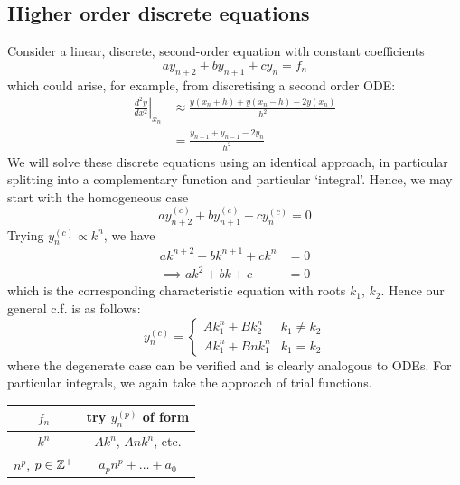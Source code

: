 \documentclass{../../template/note}
\begin{document}
    \subsection{Higher order discrete equations}

    Consider a linear, discrete, second-order equation with constant coefficients
    \[
        ay_{n+2} + by_{n+1} + cy_n = f_n
    \]
    which could arise, for example, from discretising a second order ODE:
    \begin{align*}
        \left.\frac{d^2y}{dx^2}\right|_{x_n} &\approx \frac{y(x_n+h)+y(x_n-h)-2y(x_n)}{h^2} \\
        &= \frac{y_{n+1}+y_{n-1}-2y_n}{h^2}
    \end{align*}
    We will solve these discrete equations using an identical approach, in particular splitting into a complementary function and particular `integral'. Hence, we may start with the homogeneous case
    \[
        ay_{n+2}^{(c)} + by_{n+1}^{(c)} + cy_n^{(c)} = 0
    \]
    Trying \(y_n^{(c)} \propto k^n\), we have
    \begin{align*}
        ak^{n+2} + bk^{n+1} + ck^n &= 0 \\
        \implies ak^2 + bk + c &= 0
    \end{align*}
    which is the corresponding characteristic equation with roots \(k_1\), \(k_2\). Hence our general c.f. is as follows:
    \[
        y_n^{(c)} = \begin{cases}
            Ak_1^n + Bk_2^n & k_1 \neq k_2 \\
            Ak_1^n + Bnk_1^n & k_1 = k_2
        \end{cases}
    \]
    where the degenerate case can be verified and is clearly analogous to ODEs. For particular integrals, we again take the approach of trial functions.
    
    \begin{center}
        \begin{tabular}{c c}
            \(f_n\) & try \(y_n^{(p)}\) of form \\
            \hline
            \(k^n\) & \(Ak^n\), \(Ank^n\), etc. \\
            \(n^p\), \(p \in \mathbb Z^+\) & \(a_pn^p + \dots + a_0\)
        \end{tabular}
    \end{center}
    
\end{document}
